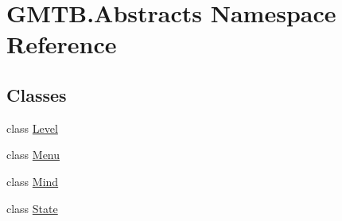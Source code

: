 \hypertarget{namespace_g_m_t_b_1_1_abstracts}{}\section{G\+M\+T\+B.\+Abstracts Namespace Reference}
\label{namespace_g_m_t_b_1_1_abstracts}
\subsection*{Classes}
\begin{DoxyCompactItemize}
\item 
class \mbox{\hyperlink{class_g_m_t_b_1_1_abstracts_1_1_level}{Level}}
\item 
class \mbox{\hyperlink{class_g_m_t_b_1_1_abstracts_1_1_menu}{Menu}}
\item 
class \mbox{\hyperlink{class_g_m_t_b_1_1_abstracts_1_1_mind}{Mind}}
\item 
class \mbox{\hyperlink{class_g_m_t_b_1_1_abstracts_1_1_state}{State}}
\end{DoxyCompactItemize}
